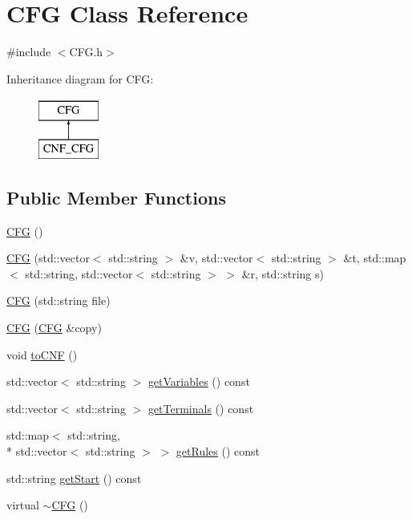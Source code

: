 \hypertarget{classCFG}{\section{C\-F\-G Class Reference}
\label{classCFG}
}


{\ttfamily \#include $<$C\-F\-G.\-h$>$}

Inheritance diagram for C\-F\-G\-:\begin{figure}[H]
\begin{center}
\leavevmode
\includegraphics[height=2.000000cm]{d7/dd4/classCFG}
\end{center}
\end{figure}
\subsection*{Public Member Functions}
\begin{DoxyCompactItemize}
\item 
\hyperlink{classCFG_a6a6d74b60d6abc9b91031aaac23067ff}{C\-F\-G} ()
\item 
\hyperlink{classCFG_ae6f918a908ebef14199ce1e6ce909196}{C\-F\-G} (std\-::vector$<$ std\-::string $>$ \&v, std\-::vector$<$ std\-::string $>$ \&t, std\-::map$<$ std\-::string, std\-::vector$<$ std\-::string $>$ $>$ \&r, std\-::string s)
\item 
\hyperlink{classCFG_a5a7524ec649377e2d8c2d8218db40b44}{C\-F\-G} (std\-::string file)
\item 
\hyperlink{classCFG_acdf5e087e7726343079e006f6dd0d43e}{C\-F\-G} (\hyperlink{classCFG}{C\-F\-G} \&copy)
\item 
void \hyperlink{classCFG_a4f0a00a699ba4a6247333a47b0bf9ff2}{to\-C\-N\-F} ()
\item 
std\-::vector$<$ std\-::string $>$ \hyperlink{classCFG_abe3e4a8324808575d5d0c033671b71ab}{get\-Variables} () const 
\item 
std\-::vector$<$ std\-::string $>$ \hyperlink{classCFG_a766b9baac4bd283b8b761139e75aae55}{get\-Terminals} () const 
\item 
std\-::map$<$ std\-::string, \\*
std\-::vector$<$ std\-::string $>$ $>$ \hyperlink{classCFG_aa861ae80a1391594cf2bf50cfac38ea9}{get\-Rules} () const 
\item 
std\-::string \hyperlink{classCFG_ae7e150fabee50d533159038262bc71d3}{get\-Start} () const 
\item 
virtual \hyperlink{classCFG_aaf69bdb0d01010bf6272a097ccc0c60c}{$\sim$\-C\-F\-G} ()
\end{DoxyCompactItemize}

